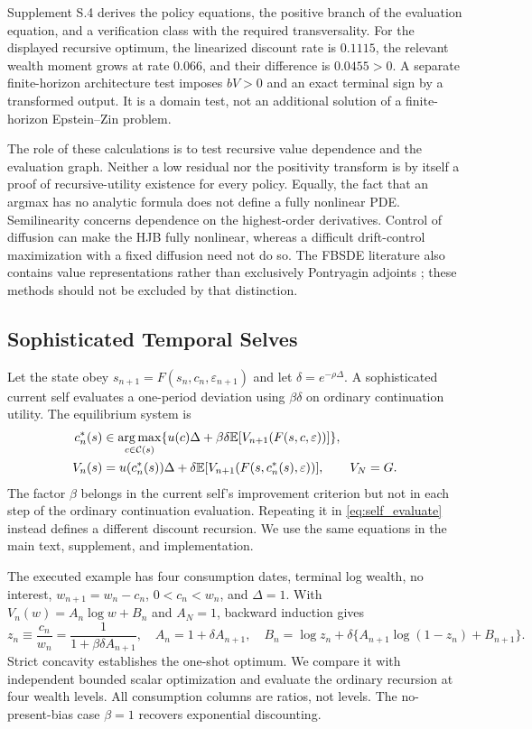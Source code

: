 Supplement S.4 derives the policy equations, the positive branch of the evaluation equation, and a verification class with the required transversality. For the displayed recursive optimum, the linearized discount rate is $0.1115$, the relevant wealth moment grows at rate $0.066$, and their difference is $0.0455>0$. A separate finite-horizon architecture test imposes $bV>0$ and an exact terminal sign by a transformed output. It is a domain test, not an additional solution of a finite-horizon Epstein--Zin problem.

The role of these calculations is to test recursive value dependence and the evaluation graph. Neither a low residual nor the positivity transform is by itself a proof of recursive-utility existence for every policy. Equally, the fact that an argmax has no analytic formula does not define a fully nonlinear PDE. Semilinearity concerns dependence on the highest-order derivatives. Control of diffusion can make the HJB fully nonlinear, whereas a difficult drift-control maximization with a fixed diffusion need not do so. The FBSDE literature also contains value representations rather than exclusively Pontryagin adjoints \citep{han2018}; these methods should not be excluded by that distinction.

\subsection{Sophisticated Temporal Selves}
Let the state obey $s_{n+1}=F(s_n,c_n,\varepsilon_{n+1})$ and let $\delta=e^{-\rho\Delta}$. A sophisticated current self evaluates a one-period deviation using $\beta\delta$ on ordinary continuation utility. The equilibrium system is
\begin{align}
 c_n^*(s)&\in\operatorname*{arg\,max}_{c\in\mathcal C(s)}
 \{u(c)\Delta+\beta\delta\mathbb E[V_{n+1}(F(s,c,\varepsilon))]\},\label{eq:self_improve}\\
 V_n(s)&=u(c_n^*(s))\Delta+\delta\mathbb E[V_{n+1}(F(s,c_n^*(s),\varepsilon))],
 \qquad V_N=G.
 \label{eq:self_evaluate}
\end{align}
The factor $\beta$ belongs in the current self's improvement criterion but not in each step of the ordinary continuation evaluation. Repeating it in \eqref{eq:self_evaluate} instead defines a different discount recursion. We use the same equations in the main text, supplement, and implementation.

The executed example has four consumption dates, terminal log wealth, no interest, $w_{n+1}=w_n-c_n$, $0<c_n<w_n$, and $\Delta=1$. With $V_n(w)=A_n\log w+B_n$ and $A_N=1$, backward induction gives
\begin{equation}
 z_n\equiv\frac{c_n}{w_n}=\frac{1}{1+\beta\delta A_{n+1}},\quad
 A_n=1+\delta A_{n+1},\quad
 B_n=\log z_n+\delta\{A_{n+1}\log(1-z_n)+B_{n+1}\}.
 \label{eq:self_closed_form}
\end{equation}
Strict concavity establishes the one-shot optimum. We compare it with independent bounded scalar optimization and evaluate the ordinary recursion at four wealth levels. All consumption columns are ratios, not levels. The no-present-bias case $\beta=1$ recovers exponential discounting.


